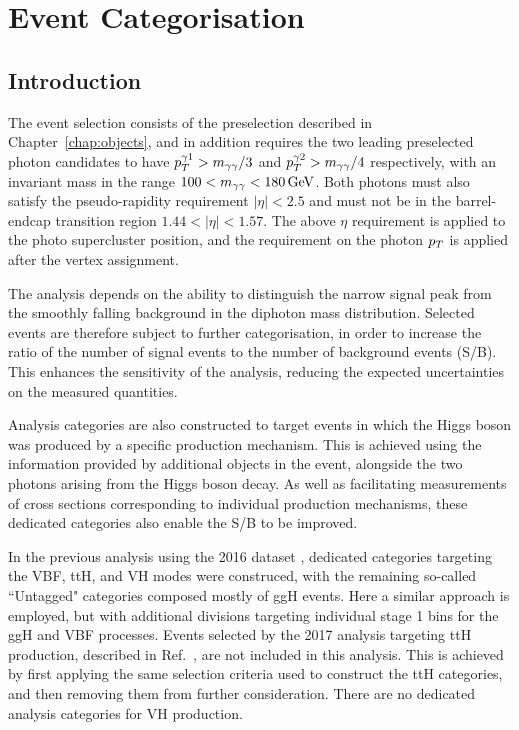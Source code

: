 \chapter{Event Categorisation}
\label{chap:categorisation}

\section{Introduction}

The event selection consists of the preselection described in Chapter~\ref{chap:objects}, 
and in addition requires the two leading preselected photon candidates to have 
$p_T^{\gamma 1} > m_{\gamma\gamma}/3$ and $p_T^{\gamma 2} > m_{\gamma\gamma} /4$ respectively, 
with an invariant mass in the range $100 < m_{\gamma\gamma} < \SI{180}{GeV}$.
Both photons must also satisfy the
pseudo-rapidity requirement $|\eta|<2.5$ and must not be in the barrel-endcap
transition region $1.44 < |\eta| < 1.57$.
The above $\eta$ requirement is applied to the photo supercluster
position, and the requirement on the photon $p_T$ is applied 
after the vertex assignment.

The \Hgg analysis depends on the ability to distinguish the narrow signal peak 
from the smoothly falling background in the diphoton mass distribution.
Selected events are therefore subject to further categorisation, in order to 
increase the ratio of the number of signal events to the number of background events (S/B).
This enhances the sensitivity of the analysis, 
reducing the expected uncertainties on the measured quantities.

Analysis categories are also constructed to target events in which the Higgs boson was 
produced by a specific production mechanism. 
This is achieved using the information provided by additional objects in the event, 
alongside the two photons arising from the Higgs boson decay.
As well as facilitating measurements of cross sections corresponding 
to individual production mechanisms, these dedicated categories also enable the S/B to be improved.

In the previous \Hgg analysis using the 2016 dataset \cite{HIG-16-040}, 
dedicated categories targeting the VBF, ttH, and VH modes were construced, 
with the remaining so-called ``Untagged" categories composed mostly of ggH events.
Here a similar approach is employed, 
but with additional divisions targeting individual stage 1 bins for the ggH and VBF processes.
Events selected by the 2017 \Hgg analysis targeting ttH production, 
described in Ref.~\cite{HIG-18-018}, are not included in this analysis. 
This is achieved by first applying the same selection criteria used to construct the ttH categories, 
and then removing them from further consideration. 
There are no dedicated analysis categories for VH production.

